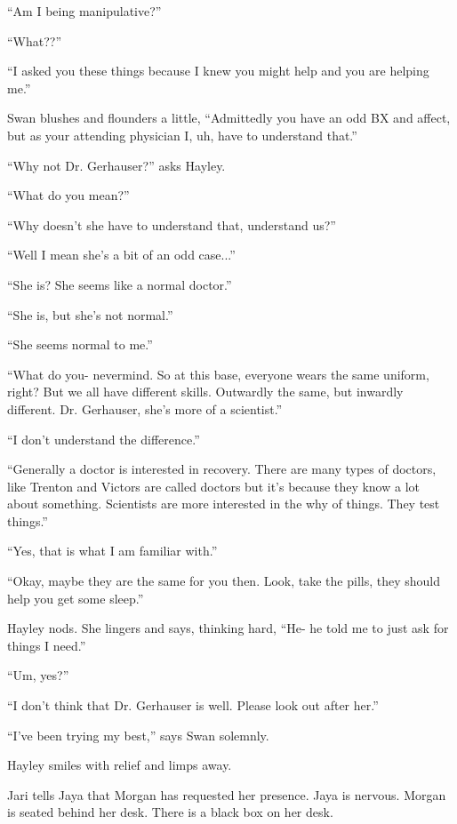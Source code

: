 ``Am I being manipulative?''

``What??''

``I asked you these things because I knew you might help and you are helping me.''

Swan blushes and flounders a little, ``Admittedly you have an odd BX and affect, but as your attending physician I, uh, have to understand that.''

``Why not Dr. Gerhauser?'' asks Hayley.

``What do you mean?''

``Why doesn't she have to understand that, understand us?''

``Well I mean she's a bit of an odd case...''

``She is?  She seems like a normal doctor.''

``She is, but she's not normal.''

``She seems normal to me.''

``What do you- nevermind.  So at this base, everyone wears the same uniform, right?  But we all have different skills.  Outwardly the same, but inwardly different.  Dr. Gerhauser, she's more of a scientist.''

``I don't understand the difference.''

``Generally a doctor is interested in recovery.  There are many types of doctors, like Trenton and Victors are called doctors but it's because they know a lot about something.  Scientists are more interested in the why of things.  They test things.''

``Yes, that is what I am familiar with.''

``Okay, maybe they are the same for you then.  Look, take the pills, they should help you get some sleep.''

Hayley nods.  She lingers and says, thinking hard, ``He- he told me to just ask for things I need.''

``Um, yes?''

``I don't think that Dr. Gerhauser is well.  Please look out after her.''

``I've been trying my best,'' says Swan solemnly.

Hayley smiles with relief and limps away.





Jari tells Jaya that Morgan has requested her presence.  Jaya is nervous.  Morgan is seated behind her desk.  There is a black box on her desk.  


